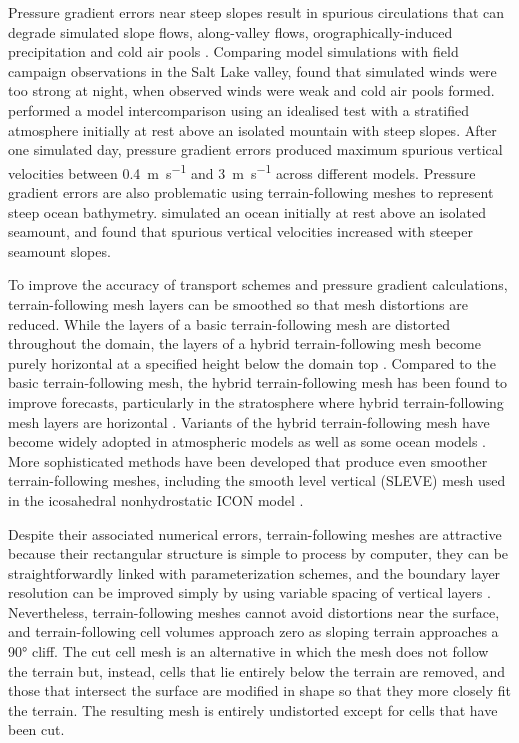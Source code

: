 Pressure gradient errors near steep slopes result in spurious circulations that can degrade simulated slope flows, along-valley flows, orographically-induced precipitation and cold air pools \citep{zaengl2004a}.
Comparing model simulations with field campaign observations in the Salt Lake valley, \citet{fast2003} found that simulated winds were too strong at night, when observed winds were weak and cold air pools formed.
\citet{zaengl2004a} performed a model intercomparison using an idealised test with a stratified atmosphere initially at rest above an isolated mountain with steep slopes.
After one simulated day, pressure gradient errors produced maximum spurious vertical velocities between \SI{0.4}{\meter\per\second} and \SI{3}{\meter\per\second} across different models.
Pressure gradient errors are also problematic using terrain-following meshes to represent steep ocean bathymetry.  
\citet{luo2002} simulated an ocean initially at rest above an isolated seamount, and found that spurious vertical velocities increased with steeper seamount slopes.

To improve the accuracy of transport schemes and pressure gradient calculations, terrain-following mesh layers can be smoothed so that mesh distortions are reduced.
While the layers of a basic terrain-following mesh are distorted throughout the domain, the layers of a hybrid terrain-following mesh become purely horizontal at a specified height below the domain top \citep{simmons-burridge1981}.
Compared to the basic terrain-following mesh, the hybrid terrain-following mesh has been found to improve forecasts, particularly in the stratosphere where hybrid terrain-following mesh layers are horizontal \citep{eckermann2014}.
Variants of the hybrid terrain-following mesh have become widely adopted in atmospheric models \citep{davies2005,donner2011} as well as some ocean models \citep{burchard-petersen1997,halliwell2004}.
More sophisticated methods have been developed that produce even smoother terrain-following meshes, including the smooth level vertical (SLEVE) mesh \citep{schaer2002,leuenberger2010} used in the icosahedral nonhydrostatic ICON model \citep{zaengl2015}.

Despite their associated numerical errors, terrain-following meshes are attractive because their rectangular structure is simple to process by computer, they can be straightforwardly linked with parameterization schemes, and the boundary layer resolution can be improved simply by using variable spacing of vertical layers \citep{schaer2002}.
Nevertheless, terrain-following meshes cannot avoid distortions near the surface, and terrain-following cell volumes approach zero as sloping terrain approaches a \ang{90} cliff.
The cut cell mesh is an alternative in which the mesh does not follow the terrain but, instead, cells that lie entirely below the terrain are removed, and those that intersect the surface are modified in shape so that they more closely fit the terrain.
The resulting mesh is entirely undistorted except for cells that have been cut.

